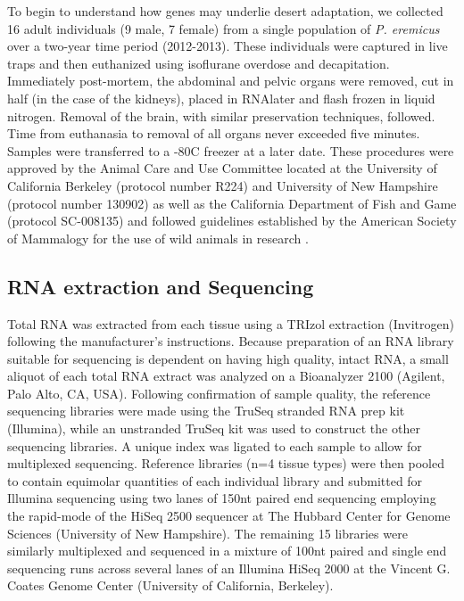 \documentclass[11pt]{article}
\begin{document}
To begin to understand how genes may underlie desert adaptation, we collected 16 adult individuals (9 male, 7 female) from a single population of \textit{P. eremicus} over a two-year time period (2012-2013). These individuals were captured in live traps and then euthanized using isoflurane overdose and decapitation. Immediately post-mortem, the abdominal and pelvic organs were removed, cut in half (in the case of the kidneys), placed in RNAlater and flash frozen in liquid nitrogen. Removal of the brain, with similar preservation techniques, followed. Time from euthanasia to removal of all organs never exceeded five minutes. Samples were transferred to a -80C freezer at a later date. These procedures were approved by the Animal Care and Use Committee located at the University of California Berkeley (protocol number R224) and University of New Hampshire (protocol number 130902) as well as the California Department of Fish and Game (protocol SC-008135) and followed guidelines established by the American Society of Mammalogy for the use of wild animals in research \cite{Sikes:2011dz}.  

\subsection*{RNA extraction and Sequencing}

Total RNA was extracted from each tissue using a TRIzol extraction (Invitrogen) following the manufacturer's instructions. Because preparation of an RNA library suitable for sequencing is dependent on having high
quality, intact RNA, a small aliquot of each total RNA extract was
analyzed on a Bioanalyzer 2100 (Agilent, Palo Alto, CA, USA).
Following confirmation of sample quality, the reference sequencing libraries
were made using the TruSeq stranded RNA prep kit
(Illumina), while an unstranded TruSeq kit was used to construct the other sequencing libraries. A unique index was ligated to each sample to allow for multiplexed sequencing. Reference libraries (n=4 tissue types) were then pooled to
contain equimolar quantities of each individual library and
submitted for Illumina sequencing using two lanes of 150nt paired end sequencing employing the rapid-mode of the HiSeq 2500 sequencer at The Hubbard Center for Genome Sciences (University of New Hampshire). The remaining 15 libraries were similarly multiplexed and sequenced in a mixture of 100nt paired and single end sequencing runs across several lanes of an Illumina HiSeq 2000 at the Vincent G. Coates Genome Center (University of California, Berkeley).
\end{document}
